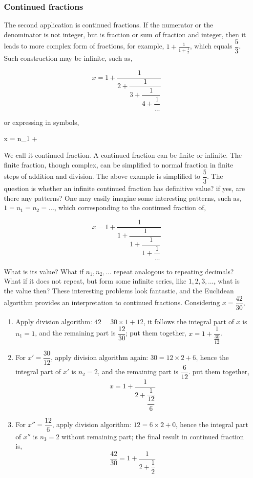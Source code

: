 \documentclass[b5paper]{article}
\begin{document}
\subsubsection{Continued fractions}
The second application is continued fractions. If the numerator or the denominator is not integer, but is fraction or sum of fraction and integer, then it leads to more complex form of fractions, for example, $1 + \frac{1}{1 + \frac{1}{2}}$, which equals $\dfrac{5}{3}$. Such construction may be infinite, such as,

\[
x = 1 + \dfrac{1}{2 + \dfrac{1}{3 + \dfrac{1}{4 + \dfrac{1}{\dotso}}}}
\]

or expressing in symbols,

\be
x = n_1 + 
\ee

We call it continued fraction. A continued fraction can be finite or infinite. The finite fraction, though complex, can be simplified to normal fraction in finite steps of addition and division. The above example is simplified to $\dfrac{5}{3}$. The question is whether an infinite continued fraction has definitive value? if yes, are there any patterns? One may easily imagine some interesting patterns, such as, $1 = n_1 = n_2 = \dotso $, which corresponding to the continued fraction of,

\[
x = 1 + \dfrac{1}{1 + \dfrac{1}{1 + \dfrac{1}{1 + \dfrac{1}{\dotso}}}}
\]

What is its value? What if $n_1, n_2, \dotsc$ repeat analogous to repeating decimals? What if it does not repeat, but form some infinite series, like $1, 2, 3, \dotso$, what is the value then? These interesting problems look fantastic, and the Euclidean algorithm provides an interpretation to continued fractions. Considering $x = \dfrac{42}{30}$,

\begin{enumerate}[{Step} 1, ]
\item Apply division algorithm: $42 = 30 \times 1 + 12$, it follows the integral part of $x$ is $n_1 = 1$, and the remaining part is $\dfrac{12}{30}$; put them together, $x = 1 + \dfrac{1}{\frac{30}{12}}$.
\item For $x' = \dfrac{30}{12}$, apply division algorithm again: $30 = 12 \times 2 + 6$, hence the integral part of $x'$ is $n_2 = 2$, and the remaining part is $\dfrac{6}{12}$. put them together,
\[
x = 1 + \dfrac{1}{2 + \dfrac{1}{\dfrac{12}{6}}}
\]
\item For $x'' = \dfrac{12}{6}$, apply division algorithm: $12 = 6 \times 2 + 0$, hence the integral part of $x''$ is $n_3 = 2$ without remaining part; the final result in continued fraction is,
\[
\dfrac{42}{30} = 1 + \dfrac{1}{2 + \dfrac{1}{2}}
\]
\end{enumerate}
\end{document}
